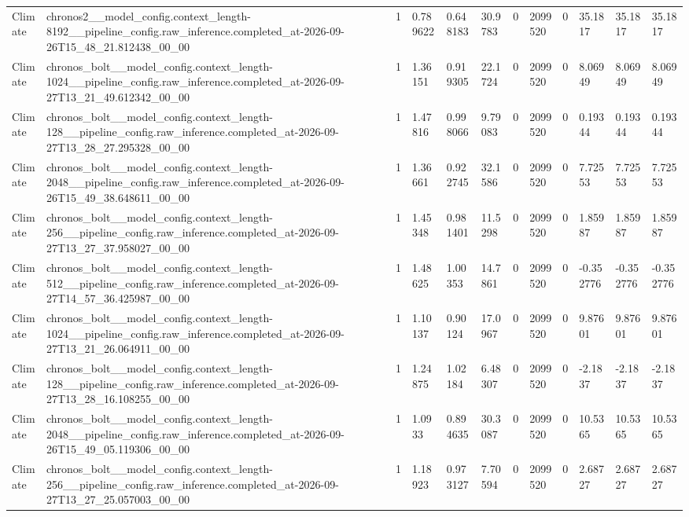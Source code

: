 \begin{tabular}{llllllllllll}
Climate & chronos2\_\_model\_config.context\_length-8192\_\_pipeline\_config.raw\_inference.completed\_at-2026-09-26T15\_48\_21.812438\_00\_00 & 1 & 0.789622 & 0.648183 & 30.9783 & 0 & 2099520 & 0 & 35.1817 & 35.1817 & 35.1817 \\
Climate & chronos\_bolt\_\_model\_config.context\_length-1024\_\_pipeline\_config.raw\_inference.completed\_at-2026-09-27T13\_21\_49.612342\_00\_00 & 1 & 1.36151 & 0.919305 & 22.1724 & 0 & 2099520 & 0 & 8.06949 & 8.06949 & 8.06949 \\
Climate & chronos\_bolt\_\_model\_config.context\_length-128\_\_pipeline\_config.raw\_inference.completed\_at-2026-09-27T13\_28\_27.295328\_00\_00 & 1 & 1.47816 & 0.998066 & 9.79083 & 0 & 2099520 & 0 & 0.19344 & 0.19344 & 0.19344 \\
Climate & chronos\_bolt\_\_model\_config.context\_length-2048\_\_pipeline\_config.raw\_inference.completed\_at-2026-09-26T15\_49\_38.648611\_00\_00 & 1 & 1.36661 & 0.922745 & 32.1586 & 0 & 2099520 & 0 & 7.72553 & 7.72553 & 7.72553 \\
Climate & chronos\_bolt\_\_model\_config.context\_length-256\_\_pipeline\_config.raw\_inference.completed\_at-2026-09-27T13\_27\_37.958027\_00\_00 & 1 & 1.45348 & 0.981401 & 11.5298 & 0 & 2099520 & 0 & 1.85987 & 1.85987 & 1.85987 \\
Climate & chronos\_bolt\_\_model\_config.context\_length-512\_\_pipeline\_config.raw\_inference.completed\_at-2026-09-27T14\_57\_36.425987\_00\_00 & 1 & 1.48625 & 1.00353 & 14.7861 & 0 & 2099520 & 0 & -0.352776 & -0.352776 & -0.352776 \\
Climate & chronos\_bolt\_\_model\_config.context\_length-1024\_\_pipeline\_config.raw\_inference.completed\_at-2026-09-27T13\_21\_26.064911\_00\_00 & 1 & 1.10137 & 0.90124 & 17.0967 & 0 & 2099520 & 0 & 9.87601 & 9.87601 & 9.87601 \\
Climate & chronos\_bolt\_\_model\_config.context\_length-128\_\_pipeline\_config.raw\_inference.completed\_at-2026-09-27T13\_28\_16.108255\_00\_00 & 1 & 1.24875 & 1.02184 & 6.48307 & 0 & 2099520 & 0 & -2.1837 & -2.1837 & -2.1837 \\
Climate & chronos\_bolt\_\_model\_config.context\_length-2048\_\_pipeline\_config.raw\_inference.completed\_at-2026-09-26T15\_49\_05.119306\_00\_00 & 1 & 1.0933 & 0.894635 & 30.3087 & 0 & 2099520 & 0 & 10.5365 & 10.5365 & 10.5365 \\
Climate & chronos\_bolt\_\_model\_config.context\_length-256\_\_pipeline\_config.raw\_inference.completed\_at-2026-09-27T13\_27\_25.057003\_00\_00 & 1 & 1.18923 & 0.973127 & 7.70594 & 0 & 2099520 & 0 & 2.68727 & 2.68727 & 2.68727 \\

\end{tabular}
